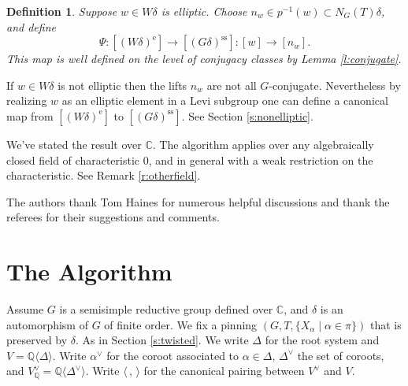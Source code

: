 \documentclass[10pt,leqno]{article}
\newtheorem{definition}[equation]{Definition}
\newcommand{\qed}{\hfill $\square$ \medskip}
\newenvironment{proof}[1][Proof]{\noindent\textbf{#1.} }{\qed}
\newcommand{\C}{\mathbb C}
\newcommand{\Q}{\mathbb Q}
\newcommand{\ch}[1]{#1^\vee}
\renewcommand{\sec}[1]{\section{#1}
\renewcommand{\theequation}{\thesection.\arabic{equation}}
  \setcounter{equation}{0}}
\newcommand\inv{^{-1}}
\renewcommand{\ss}{\text{ss}}
\newcommand{\e}{\text{e}}
\def\d{\delta}
\renewcommand{\sec}[1]{\section{#1}
\renewcommand{\theequation}{\thesection.\arabic{equation}}
  \setcounter{equation}{0}}
\begin{document}
\begin{comment}
\begin{proof}
Suppose $g\in p\inv(w)\subset N_G(T)\delta$. 
Then for $t\in T$
$$
tgt\inv=tw(t\inv)g.
$$
Since $w$ is elliptic the map $t\rightarrow tw(t\inv)$ has finite
kernel, so is surjective.

Now suppose $g_1,g_2\in p\inv(w)$.
Since $w\in W\delta$, $g_1,g_2\in G\delta$. Write $g_1=h_1\delta,g_2=h_2\delta$ with $h_1,h_2\in G$.
By the previous discussion choose $t$ so that $tw(t\inv)=h_2h_1\inv$. Then $tg_1t\inv=g_2$.
\end{proof}
\end{comment}

\begin{definition}
 \label{d:basictwisted}
Suppose $w\in W\delta$ is elliptic.
Choose $n_w\in p\inv(w)\subset N_G(T)\delta$, and define
$$
\Psi: [(W\delta)^\e]\rightarrow[(G\delta)^{\ss}]: [w]\rightarrow [n_w].
$$
This map is well defined on the level of conjugacy classes by Lemma \ref{l:conjugate}.
\end{definition}

If $w\in W\delta$ is not elliptic then the lifts $n_w$ are not all $G$-conjugate. Nevertheless
by realizing $w$ as an elliptic element in a Levi subgroup one can define a canonical map
from $[(W\delta)^\e]$ to $[(G\delta)^{\ss}]$. See Section \ref{s:nonelliptic}.

We've stated the result over $\C$. The algorithm applies over any
algebraically closed field of characteristic $0$, and in general with
a weak restriction on the characteristic. See Remark
\ref{r:otherfield}.

The authors thank Tom Haines for numerous helpful discussions and thank the referees for their suggestions and comments. 

\sec{The Algorithm}
\label{const}

Assume $G$ is a semisimple reductive group defined over $\C$, and
$\delta$ is an automorphism of $G$ of finite order. We fix a pinning
$(G,T,\{X_\alpha\mid\alpha\in\pi\})$ that is preserved by $\d$. As in Section \ref{s:twisted}.  We write $\Delta$ for
the root system and $V=\Q\langle\Delta\rangle$.  Write $\ch\alpha$ for
the coroot associated to $\alpha\in\Delta$, $\ch\Delta$ the set of
coroots, and $\ch V_\Q=\Q\langle\ch\Delta\rangle$.
Write $\langle\,,\,\rangle$ for the canonical pairing between $\ch V$ and $V$.
\end{document}
